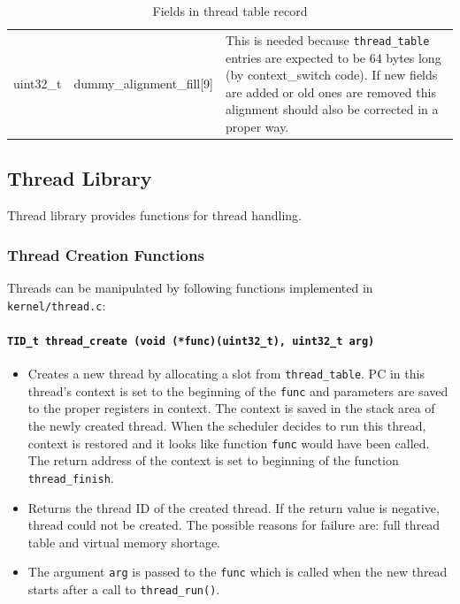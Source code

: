 \documentclass[twoside,a4paper]{report}
\makeatletter
\newcommand{\PBS}[1]{\let\temp=\\#1\let\\=\temp}
\newlength{\tablewidth}
\newenvironment{function}[3]{%
\paragraph{\texttt{#1 {\textbf{#2}} (#3)}}%
\index{#2@\texttt{#2}}%
\begin{itemize}%
}{%
\end{itemize}%
}
\makeatother
\begin{document}
\begin{table}
\begin{center}
\begin{tabularx}{\tablewidth}{l|l|>{\PBS\raggedright}X}
\hline

uint32\_t & dummy\_alignment\_fill[9] & This is needed because
\texttt{thread\_table} entries are expected to be 64 bytes long (by
context\_switch code). If new fields are added or old ones are removed
this alignment should also be corrected in a proper way.

\end{tabularx}
\end{center}
\caption{Fields in thread table record}
\label{tab:threadtable}
\end{table}


\subsection{Thread Library}
\label{sec:threadlib}


Thread library provides functions for thread handling.

\subsubsection{Thread Creation Functions}


Threads can be manipulated by following functions implemented in
\texttt{kernel/thread.c}:

\begin{function}{TID\_t}{thread\_create}{void (*func)(uint32\_t), uint32\_t arg}

\item Creates a new thread by allocating a slot from
\texttt{thread\_table}. PC in this thread's context is set to the
beginning of the \texttt{func} and parameters are saved to the proper
registers in context. The context is saved in the stack area of the
newly created thread. When the scheduler decides to run this thread,
context is restored and it looks like function \texttt{func} would
have been called. The return address of the context is set to
beginning of the function \texttt{thread\_finish}.

\item Returns the thread ID of the created thread. If the return value
is negative, thread could not be created. The possible reasons for
failure are: full thread table and virtual memory shortage.

\item The argument \texttt{arg} is passed to the \texttt{func} which is
called when the new thread starts after a call to \texttt{thread\_run()}.

\end{function}
\end{document}
